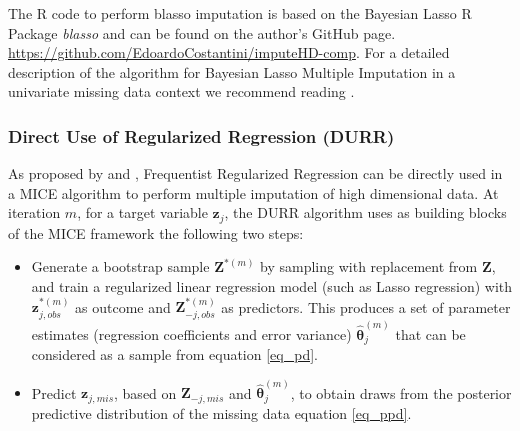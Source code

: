 	The R code to perform blasso imputation is based on the Bayesian Lasso R Package \emph{blasso} \citep{blasso} and can 
	be found on the author's GitHub page. \url{https://github.com/EdoardoCostantini/imputeHD-comp}.
	For a detailed description of the algorithm for Bayesian Lasso Multiple Imputation in a univariate
	missing data context we recommend reading \cite{zhaoLong:2016}.

\subsubsection{Direct Use of Regularized Regression (DURR)}
	As proposed by \cite{zhaoLong:2016} and \cite{dengEtAl:2016}, Frequentist Regularized Regression can be 
	directly used in a MICE algorithm to perform multiple imputation of high dimensional data.
	At iteration $m$, for a target variable $\bm{z}_j$, the DURR algorithm uses as building blocks of the 
	MICE framework the following two steps:

	\begin{itemize}

	\item Generate a bootstrap sample $\bm{Z}^{*(m)}$ by sampling with replacement from $\bm{Z}$,
		and train a regularized linear regression model (such as Lasso regression) with
		$\bm{z}_{j,obs}^{*(m)}$ as outcome and $\bm{Z}_{-j,obs}^{*(m)}$ as predictors.
		This produces a set of parameter estimates (regression coefficients and error variance)
		$\hat{\bm{\theta}}_{j}^{(m)}$ that can be considered as a sample from equation \eqref{eq_pd}.

	\item Predict $\bm{z}_{j,mis}$, based on $\bm{Z}_{-j, mis}$ and $\hat{\bm{\theta}}_{j}^{(m)}$, 
		to obtain draws from the posterior predictive distribution of the missing data equation 
		\eqref{eq_ppd}.

	\end{itemize}

